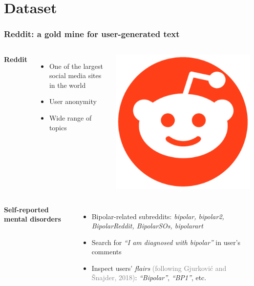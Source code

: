 \documentclass{beamer}
\newcommand{\maybe}[1]{\textcolor{gray}{#1}}
\begin{document}

\section{Dataset}
\begin{frame}
\frametitle{Reddit: a gold mine for user-generated text}
\begin{columns}
    \textbf{Reddit}
  \begin{itemize}
    \item One of the largest social media sites in the world
    \item User anonymity
    \item Wide range of topics
\end{itemize}

%
    \includegraphics[scale=0.06]{imgs/redditlogo.png}
\end{columns}

\vspace{4 mm}

\begin{columns}
\textbf{Self-reported mental disorders}
\begin{itemize}
  \item Bipolar-related subreddits: \textit{bipolar, bipolar2, BipolarReddit, BipolarSOs, bipolarart}
  \item Search for \textit{``I am diagnosed with bipolar''} in user's comments
  \item Inspect users' \textit{flairs} \maybe{(following Gjurkovi\'c and \v{S}najder, 2018)}: \textit{``Bipolar''}, \textit{``BP1''}, etc.
\end{itemize}

\end{columns}
\end{frame}
\end{document}
